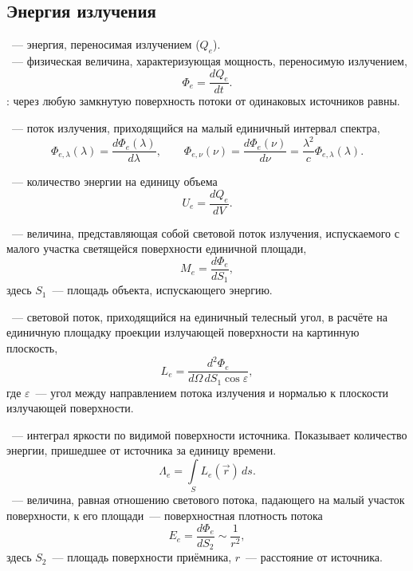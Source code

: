 \subsection{Энергия излучения}
~--- энергия, переносимая излучением ($Q_e$).\\
~--- физическая величина, характеризующая мощность, переносимую излучением,
\begin{equation}
 \Phi_e = \frac{d Q_e}{dt}.
\end{equation}
: через любую замкнутую поверхность потоки от одинаковых источников равны.

~--- поток излучения, приходящийся на малый единичный интервал спектра,
\begin{equation}
\Phi_{e, \lambda}(\lambda) = \frac{d\Phi_e(\lambda)}{d\lambda}, \quad\quad \Phi_{e, \nu}(\nu) = \frac{d\Phi_e(\nu)}{d\nu} =  \frac{\lambda^2}{c}\Phi_{e, \lambda}(\lambda).
\end{equation}

~--- количество энергии на единицу объема
\begin{equation}
U_e = \frac{d Q_e}{dV}.
\end{equation}

~--- величина, представляющая собой световой поток излучения, испускаемого с малого участка светящейся поверхности единичной площади,
\begin{equation}
M_e = \frac{d \Phi_e}{dS_1},
\end{equation}
здесь $S_1$~--- площадь объекта, испускающего энергию.

~--- световой поток, приходящийся на единичный телесный угол, в расчёте на единичную площадку проекции излучающей поверхности на картинную плоскость, 
\begin{equation}
L_e = \frac{d^2 \Phi_e}{d \Omega\,dS_1 \cos \varepsilon},
\end{equation}
где $\varepsilon$~--- угол между направлением потока излучения и нормалью к плоскости излучающей поверхности.

~--- интеграл яркости по видимой поверхности источника. Показывает количество энергии, пришедшее от источника за единицу времени.
\begin{equation}
\Lambda_e = \int \limits_S L_e(\vec{r})\,ds.
\end{equation}
~--- величина, равная отношению светового потока, падающего на малый участок поверхности, к его площади~--- поверхностная плотность потока
\begin{equation}
E_e = \frac{d\Phi_e}{dS_2} \sim \frac{1}{r^2},
\end{equation}
здесь $S_2$~--- площадь поверхности приёмника, $r$~--- расстояние от источника.